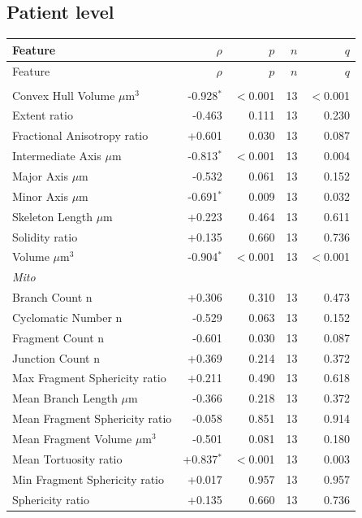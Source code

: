 \documentclass[11pt,a4paper]{article}
\begin{document}
\subsection*{Patient level}
\begin{longtable}{lrrrr}
\toprule
Feature & $\rho$ & $p$ & $n$ & $q$ \\
\midrule\endfirsthead
\toprule Feature & $\rho$ & $p$ & $n$ & $q$ \\\midrule\endhead
\bottomrule\endfoot
\multicolumn{5}{l}{\textit{Actin}} \\
  Convex Hull Volume $\mu$m$^{3}$ & -0.928$^{*}$ & $<$0.001 & 13 & $<$0.001 \\
  Extent ratio & -0.463 & 0.111 & 13 & 0.230 \\
  Fractional Anisotropy ratio & +0.601 & 0.030 & 13 & 0.087 \\
  Intermediate Axis $\mu$m & -0.813$^{*}$ & $<$0.001 & 13 & 0.004 \\
  Major Axis $\mu$m & -0.532 & 0.061 & 13 & 0.152 \\
  Minor Axis $\mu$m & -0.691$^{*}$ & 0.009 & 13 & 0.032 \\
  Skeleton Length $\mu$m & +0.223 & 0.464 & 13 & 0.611 \\
  Solidity ratio & +0.135 & 0.660 & 13 & 0.736 \\
  Volume $\mu$m$^{3}$ & -0.904$^{*}$ & $<$0.001 & 13 & $<$0.001 \\
\midrule
\multicolumn{5}{l}{\textit{Mito}} \\
  Branch Count n & +0.306 & 0.310 & 13 & 0.473 \\
  Cyclomatic Number n & -0.529 & 0.063 & 13 & 0.152 \\
  Fragment Count n & -0.601 & 0.030 & 13 & 0.087 \\
  Junction Count n & +0.369 & 0.214 & 13 & 0.372 \\
  Max Fragment Sphericity ratio & +0.211 & 0.490 & 13 & 0.618 \\
  Mean Branch Length $\mu$m & -0.366 & 0.218 & 13 & 0.372 \\
  Mean Fragment Sphericity ratio & -0.058 & 0.851 & 13 & 0.914 \\
  Mean Fragment Volume $\mu$m$^{3}$ & -0.501 & 0.081 & 13 & 0.180 \\
  Mean Tortuosity ratio & +0.837$^{*}$ & $<$0.001 & 13 & 0.003 \\
  Min Fragment Sphericity ratio & +0.017 & 0.957 & 13 & 0.957 \\
  Sphericity ratio & +0.135 & 0.660 & 13 & 0.736 \\

\end{longtable}
\end{document}
